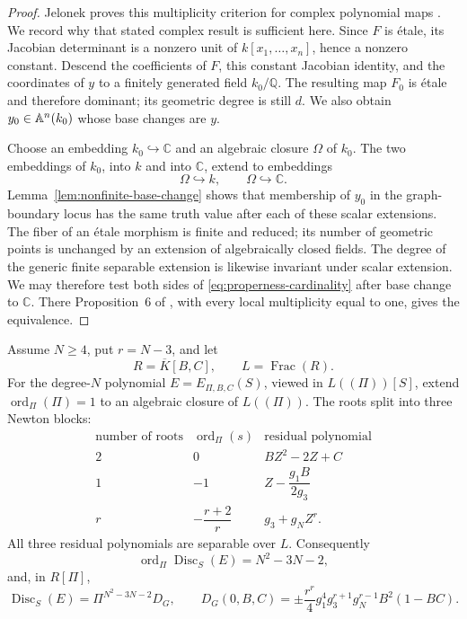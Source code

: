 \begin{proof}
Jelonek proves this multiplicity criterion for complex polynomial maps
\cite[Proposition~6, p.~261]{Jelonek1993}.  We record why that stated complex result
is sufficient here.  Since \(F\) is \'etale, its Jacobian determinant is a
nonzero unit of \(k[x_1,\ldots,x_n]\), hence a nonzero constant.  Descend the
coefficients of \(F\), this constant Jacobian identity, and the coordinates
of \(y\) to a finitely generated field \(k_0/\mathbb Q\).  The resulting map
\(F_0\) is \'etale and therefore dominant; its geometric degree is still
\(d\).  We also obtain \(y_0\in\mathbb A^n(k_0)\) whose base changes are \(y\).

Choose an embedding \(k_0\hookrightarrow\mathbb C\) and an algebraic closure
\(\Omega\) of \(k_0\).  The two embeddings of \(k_0\), into \(k\) and into
\(\mathbb C\), extend to embeddings
\[
 \Omega\hookrightarrow k,\qquad \Omega\hookrightarrow\mathbb C.
\]
Lemma~\ref{lem:nonfinite-base-change} shows that membership of \(y_0\) in
the graph-boundary locus has the same truth value after each of these scalar
extensions.  The fiber of an \'etale morphism is finite and reduced; its
number of geometric points is unchanged by an extension of algebraically
closed fields.  The degree of the generic finite separable extension is
likewise invariant under scalar extension.  We may therefore test both
sides of \eqref{eq:properness-cardinality} after base change to
\(\mathbb C\).  There Proposition~6 of \cite{Jelonek1993}, with every local
multiplicity equal to one, gives the equivalence.
\end{proof}

\begin{lemma}
\label{lem:exact-discriminant-order}
Assume \(N\geq4\), put \(r=N-3\), and let
\[
 R=\overline K[B,C],\qquad L=\operatorname{Frac}(R).
\]
For the degree-\(N\) polynomial \(E=E_{\Pi,B,C}(S)\), viewed in
\(L((\Pi))[S]\), extend \(\operatorname{ord}_\Pi(\Pi)=1\) to an algebraic
closure of \(L((\Pi))\).  The roots split into three Newton blocks:
\begin{equation}
\begin{array}{c|c|c}
\text{number of roots}&\operatorname{ord}_\Pi(s)&
 \text{residual polynomial}\\ \hline
2&0&BZ^2-2Z+C\\
1&-1&Z-\dfrac{g_1B}{2g_3}\\[4pt]
r&-\dfrac{r+2}{r}&g_3+g_NZ^r.
\end{array}
\label{eq:newton-blocks}
\end{equation}
All three residual polynomials are separable over \(L\).  Consequently
\[
 \operatorname{ord}_\Pi\operatorname{Disc}_S(E)
 =N^2-3N-2,
\]
and, in \(R[\Pi]\),
\[
 \operatorname{Disc}_S(E)=\Pi^{N^2-3N-2}D_G,\qquad
 D_G(0,B,C)=
 \pm\frac{r^r}{4}g_1^4g_3^{r+1}g_N^{r-1}B^2(1-BC).
\]
\end{lemma}

